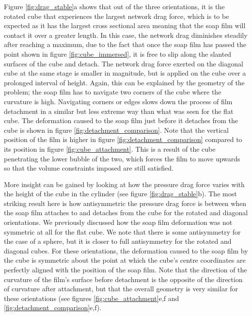 \documentclass[preprint]{revtex4-1}
\begin{document}
Figure \ref{fig:drag_stable}a shows that out of the three orientations, it is the rotated cube that experiences the largest network drag force, which is to be expected as it has the largest cross sectional area meaning that the soap film will contact it over a greater length. In this case, the network drag diminishes steadily after reaching a maximum, due to the fact that once the soap film has passed the point shown in figure \ref{fig:cube_immersed}, it is free to slip along the slanted surfaces of the cube and detach. The network drag force exerted on the diagonal cube at the same stage is smaller in magnitude, but is applied on the cube over a prolonged interval of height. Again, this can be explained by the geometry of the problem; the soap film has to navigate two corners of the cube where the curvature is high. Navigating corners or edges slows down the process of film detachment in a similar but less extreme way than what was seen for the flat cube. The deformation caused to the soap film just before it detaches from the cube is shown in figure \ref{fig:detachment_comparison}. Note that the vertical position of the film is higher in figure \ref{fig:detachment_comparison} compared to its position in figure \ref{fig:cube_attachment}. This is a result of the cube penetrating the lower bubble of the two, which forces the film to move upwards so that the volume constraints imposed are still satisfied.  


More insight can be gained by looking at how the pressure drag force varies with the height of the cube in the cylinder (see figure \ref{fig:drag_stable}b). The most striking result here is how antisymmetric the pressure drag force is between when the soap film attaches to and detaches from the cube for the rotated and diagonal orientations. We previously discussed how the soap film deformation was not symmetric at all for the flat cube. We note that there is some antisymmetry for the case of a sphere, but it is closer to full antisymmetry for the rotated and diagonal cubes. For these orientations, the deformation caused to the soap film by the cube is symmetric about the point at which the cube's centre coordinates are perfectly aligned with the position of the soap film. Note that the direction of the curvature of the film's surface before detachment is the opposite of the direction of curvature after attachment, but that the overall geometry is very similar for these orientations (see figures \ref{fig:cube_attachment}e,f and \ref{fig:detachment_comparison}e,f). 
\end{document}
